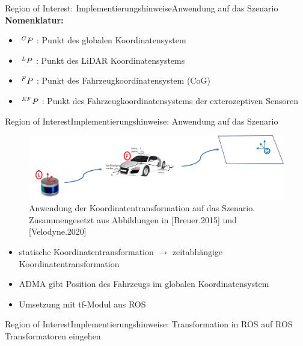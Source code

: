 \documentclass[169, handout	]{THIbeamer} %
\begin{document}
	\begin{frame}{Region of Interest: Implementierungshinweise}{Anwendung auf das Szenario}
		\textbf{Nomenklatur:} 
		\begin{itemize}
			\item $\hspace*{0.2em}^G\vspace*{-0.2em}P$ : Punkt des globalen Koordinatensystem
			\item $\hspace*{0.2em}^L\vspace*{-0.2em}P$ : Punkt des LiDAR Koordinatensystems
			\item $\hspace*{0.2em}^F\vspace*{-0.2em}P$ : Punkt des Fahrzeugkoordinatensystem (CoG)
			\item $\hspace*{0.2em}^{EF}\vspace*{-0.2em}P$ : Punkt des Fahrzeugkoordinatensystems der exterozeptiven Sensoren
		\end{itemize}
	\end{frame}
	\begin{frame}{Region of Interest}{Implementierungshinweise: Anwendung auf das Szenario}
		\begin{figure}
			\includegraphics[scale=0.5]{required/Szenarioanwendung Koordinatentransformation.jpg}
			\caption{Anwendung der Koordinatentransformation auf das Szenario. Zusammengesetzt aus Abbildungen in [Breuer.2015] und [Velodyne.2020]}
        	\label{Globales Koordinatensystem}
       	\end{figure}
       	\begin{itemize}
       		\item statische Koordinatentransformation $\rightarrow$ zeitabhängige Koordinatentransformation
			\item ADMA gibt Position des Fahrzeugs im globalen Koordinatensystem
			\item Umsetzung mit tf-Modul aus ROS
       	\end{itemize}
	\end{frame}
	\begin{frame}{Region of Interest}{Implementierungshinweise: Transformation in ROS}	
		auf ROS Transformatoren eingehen
	\end{frame}
\end{document}
